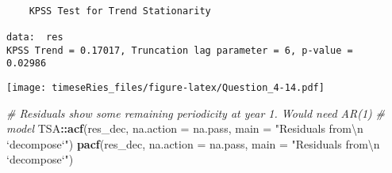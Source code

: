 \documentclass[]{book}
\newenvironment{Shaded}{\begin{snugshade}}{\end{snugshade}}
\newcommand{\KeywordTok}[1]{\textcolor[rgb]{0.13,0.29,0.53}{\textbf{#1}}}
\newcommand{\DataTypeTok}[1]{\textcolor[rgb]{0.13,0.29,0.53}{#1}}
\newcommand{\DecValTok}[1]{\textcolor[rgb]{0.00,0.00,0.81}{#1}}
\newcommand{\CharTok}[1]{\textcolor[rgb]{0.31,0.60,0.02}{#1}}
\newcommand{\StringTok}[1]{\textcolor[rgb]{0.31,0.60,0.02}{#1}}
\newcommand{\CommentTok}[1]{\textcolor[rgb]{0.56,0.35,0.01}{\textit{#1}}}
\newcommand{\OperatorTok}[1]{\textcolor[rgb]{0.81,0.36,0.00}{\textbf{#1}}}
\newcommand{\NormalTok}[1]{#1}
\begin{document}
\begin{verbatim}

    KPSS Test for Trend Stationarity

data:  res
KPSS Trend = 0.17017, Truncation lag parameter = 6, p-value =
0.02986
\end{verbatim}

\begin{Shaded}
\end{Shaded}

\texttt{[image: timeseRies\_files/figure-latex/Question\_4-14.pdf]}

\begin{Shaded}
\begin{Highlighting}[]
\CommentTok{# Residuals show some remaining periodicity at year 1. Would need AR(1)}
\CommentTok{# model}
\NormalTok{TSA}\OperatorTok{::}\KeywordTok{acf}\NormalTok{(res_dec, }\DataTypeTok{na.action =}\NormalTok{ na.pass, }\DataTypeTok{main =} \StringTok{"Residuals from}\CharTok{\textbackslash{}n}\StringTok{ `decompose`"}\NormalTok{)}
\KeywordTok{pacf}\NormalTok{(res_dec, }\DataTypeTok{na.action =}\NormalTok{ na.pass, }\DataTypeTok{main =} \StringTok{"Residuals from}\CharTok{\textbackslash{}n}\StringTok{ `decompose`"}\NormalTok{)}
\end{Highlighting}
\end{Shaded}
\end{document}
